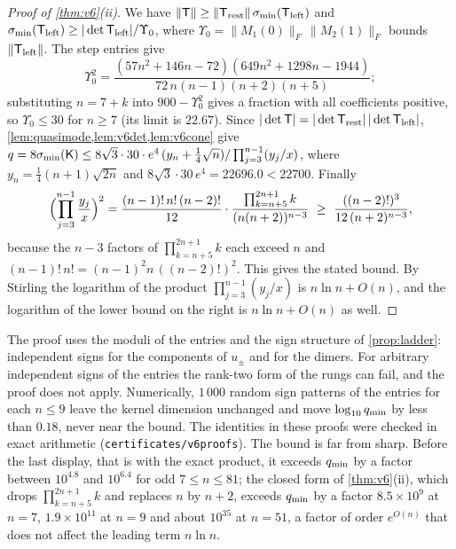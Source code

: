 \begin{proof}[Proof of \cref{thm:v6}(ii)]
We have $\|\mathsf T\|\ge\|\mathsf T_{\rm rest}\|\,\sigma_{\min}(\mathsf T_{\rm left})$ and
$\sigma_{\min}(\mathsf T_{\rm left})\ge|\det\mathsf T_{\rm left}|/\Upsilon_0$, where
$\Upsilon_0=\|M_1(0)\|_F\,\|M_2(1)\|_F$ bounds $\|\mathsf T_{\rm left}\|$. The step entries
give
\[
  \Upsilon_0^2=\frac{(57n^2+146n-72)(649n^2+1298n-1944)}{72\,n(n-1)(n+2)(n+5)};
\]
substituting $n=7+k$ into $900-\Upsilon_0^2$ gives a fraction with all coefficients positive, so
$\Upsilon_0\le30$ for $n\ge7$ (its limit is $22.67$). Since $|\det\mathsf T|=|\det\mathsf T_{\rm rest}|\,
|\det\mathsf T_{\rm left}|$, \cref{lem:quasimode,lem:v6det,lem:v6cone} give
$q=8\sigma_{\min}(\mathsf K)\le8\sqrt3\cdot30\cdot e^4\,(y_n+\frac14\sqrt n)/\prod_{j=3}^{n-1}(y_j/x)$, where
$y_n=\frac14(n+1)\sqrt{2n}$ and $8\sqrt3\cdot30\,e^4=22696.0<22700$. Finally
\[
  \Bigl(\prod_{j=3}^{n-1}\frac{y_j}x\Bigr)^2=\frac{(n-1)!\,n!\,(n-2)!}{12}\cdot\frac{\prod_{k=n+5}^{2n+1}k}{(n(n+2))^{n-3}}
  \ \ge\ \frac{((n-2)!)^3}{12\,(n+2)^{n-3}},
\]
because the $n-3$ factors of $\prod_{k=n+5}^{2n+1}k$ each exceed $n$ and
$(n-1)!\,n!=(n-1)^2n\,((n-2)!)^2$. This gives the stated bound. By Stirling the logarithm of the
product $\prod_{j=3}^{n-1}(y_j/x)$ is $n\ln n+O(n)$, and the logarithm of the lower bound
on the right is $n\ln n+O(n)$ as well.
\end{proof}

The proof uses the moduli of the entries and the sign structure of \cref{prop:ladder}:
independent signs for the components of $u_\pm$ and for the dimers. For arbitrary
independent signs of the entries the rank-two form of the rungs can fail, and the proof
does not apply. Numerically, $1\,000$ random sign patterns of the entries for each
$n\le9$ leave the kernel dimension unchanged and move $\log_{10}q_{\min}$ by less than $0.18$,
never near the bound. The identities in
these proofs were checked in exact arithmetic (\texttt{certificates/v6proofs}). The bound is
far from sharp. Before the last display, that is with the exact product, it exceeds
$q_{\min}$ by a factor between $10^{4.8}$ and $10^{6.4}$ for odd $7\le n\le81$; the closed form
of \cref{thm:v6}(ii), which drops $\prod_{k=n+5}^{2n+1}k$ and replaces $n$ by $n+2$, exceeds
$q_{\min}$ by a factor $8.5\times10^9$ at $n=7$, $1.9\times10^{11}$ at $n=9$ and about $10^{35}$
at $n=51$, a factor of order
$e^{O(n)}$ that does not affect the leading term $n\ln n$.
